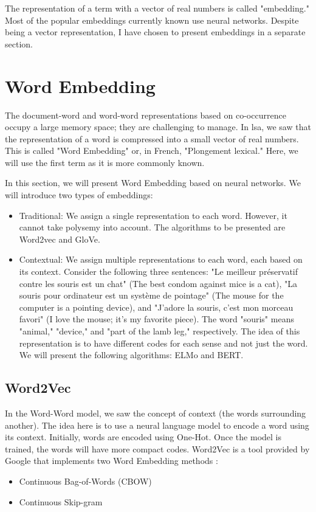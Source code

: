 \documentclass{KBook}
\begin{document}
The representation of a term with a vector of real numbers is called "embedding."
Most of the popular embeddings currently known use neural networks. Despite being a vector representation, I have chosen to present embeddings in a separate section.

\section{Word Embedding}

The document-word and word-word representations based on co-occurrence occupy a large memory space; they are challenging to manage.
In \ac{lsa}, we saw that the representation of a word is compressed into a small vector of real numbers. This is called "Word Embedding" or, in French, "Plongement lexical." Here, we will use the first term as it is more commonly known.

In this section, we will present Word Embedding based on neural networks. We will introduce two types of embeddings:
\begin{itemize}
	\item Traditional: We assign a single representation to each word. However, it cannot take polysemy into account. The algorithms to be presented are Word2vec and GloVe.
	\item Contextual: We assign multiple representations to each word, each based on its context. Consider the following three sentences: "Le meilleur préservatif contre les souris est un chat" (The best condom against mice is a cat), "La souris pour ordinateur est un système de pointage" (The mouse for the computer is a pointing device), and "J'adore la souris, c'est mon morceau favori" (I love the mouse; it's my favorite piece). The word "souris" means "animal," "device," and "part of the lamb leg," respectively. The idea of this representation is to have different codes for each sense and not just the word. We will present the following algorithms: ELMo and BERT.
\end{itemize}

\subsection{Word2Vec}

In the Word-Word model, we saw the concept of context (the words surrounding another). The idea here is to use a neural language model to encode a word using its context. Initially, words are encoded using One-Hot. Once the model is trained, the words will have more compact codes. Word2Vec is a tool provided by Google that implements two Word Embedding methods \cite{2013-mikolov-al}:
\begin{itemize}
	\item Continuous Bag-of-Words (CBOW)
	\item Continuous Skip-gram
\end{itemize}
\end{document}
